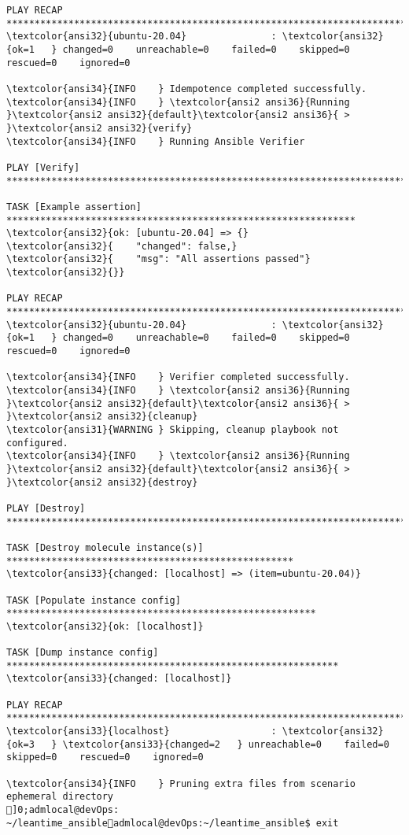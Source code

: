 \documentclass{scrartcl}
\begin{document}
\begin{Verbatim}
PLAY RECAP ****************************************************************************
\textcolor{ansi32}{ubuntu-20.04}               : \textcolor{ansi32}{ok=1   } changed=0    unreachable=0    failed=0    skipped=0    rescued=0    ignored=0

\textcolor{ansi34}{INFO    } Idempotence completed successfully.
\textcolor{ansi34}{INFO    } \textcolor{ansi2 ansi36}{Running }\textcolor{ansi2 ansi32}{default}\textcolor{ansi2 ansi36}{ > }\textcolor{ansi2 ansi32}{verify}
\textcolor{ansi34}{INFO    } Running Ansible Verifier

PLAY [Verify] *************************************************************************

TASK [Example assertion] **************************************************************
\textcolor{ansi32}{ok: [ubuntu-20.04] => {}
\textcolor{ansi32}{    "changed": false,}
\textcolor{ansi32}{    "msg": "All assertions passed"}
\textcolor{ansi32}{}}

PLAY RECAP ****************************************************************************
\textcolor{ansi32}{ubuntu-20.04}               : \textcolor{ansi32}{ok=1   } changed=0    unreachable=0    failed=0    skipped=0    rescued=0    ignored=0

\textcolor{ansi34}{INFO    } Verifier completed successfully.
\textcolor{ansi34}{INFO    } \textcolor{ansi2 ansi36}{Running }\textcolor{ansi2 ansi32}{default}\textcolor{ansi2 ansi36}{ > }\textcolor{ansi2 ansi32}{cleanup}
\textcolor{ansi31}{WARNING } Skipping, cleanup playbook not configured.
\textcolor{ansi34}{INFO    } \textcolor{ansi2 ansi36}{Running }\textcolor{ansi2 ansi32}{default}\textcolor{ansi2 ansi36}{ > }\textcolor{ansi2 ansi32}{destroy}

PLAY [Destroy] ************************************************************************

TASK [Destroy molecule instance(s)] ***************************************************
\textcolor{ansi33}{changed: [localhost] => (item=ubuntu-20.04)}

TASK [Populate instance config] *******************************************************
\textcolor{ansi32}{ok: [localhost]}

TASK [Dump instance config] ***********************************************************
\textcolor{ansi33}{changed: [localhost]}

PLAY RECAP ****************************************************************************
\textcolor{ansi33}{localhost}                  : \textcolor{ansi32}{ok=3   } \textcolor{ansi33}{changed=2   } unreachable=0    failed=0    skipped=0    rescued=0    ignored=0

\textcolor{ansi34}{INFO    } Pruning extra files from scenario ephemeral directory
]0;admlocal@devOps: ~/leantime_ansibleadmlocal@devOps:~/leantime_ansible$ exit

\end{Verbatim}
\end{document}
